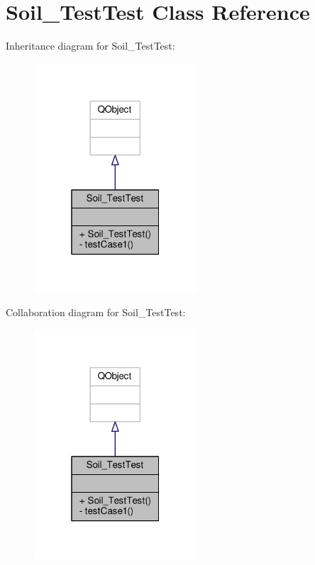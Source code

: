 \hypertarget{class_soil___test_test}{}\section{Soil\+\_\+\+Test\+Test Class Reference}
\label{class_soil___test_test}


Inheritance diagram for Soil\+\_\+\+Test\+Test\+:\nopagebreak
\begin{figure}[H]
\begin{center}
\leavevmode
\includegraphics[width=172pt]{class_soil___test_test__inherit__graph}
\end{center}
\end{figure}


Collaboration diagram for Soil\+\_\+\+Test\+Test\+:\nopagebreak
\begin{figure}[H]
\begin{center}
\leavevmode
\includegraphics[width=172pt]{class_soil___test_test__coll__graph}
\end{center}
\end{figure}
